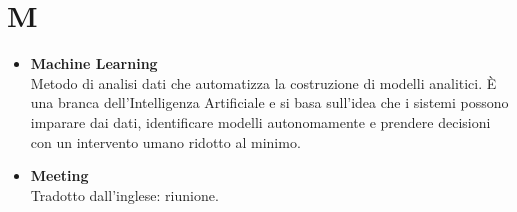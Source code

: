 \chapter{M} \label{M}
\begin{itemize}
	\item \textbf{Machine Learning} \\
	Metodo di analisi dati che automatizza la costruzione di modelli analitici. È una branca dell'Intelligenza Artificiale e si basa sull'idea che i sistemi possono imparare dai dati, identificare modelli autonomamente e prendere decisioni con un intervento umano ridotto al minimo.
	
	\item \textbf{Meeting}\\
	Tradotto dall’inglese: riunione.
\end{itemize}